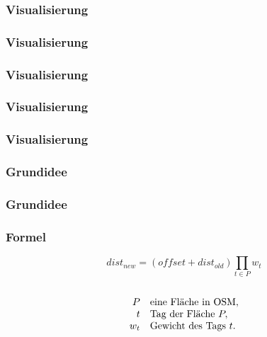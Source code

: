 \begin{frame}
  \frametitle{Visualisierung}
\end{frame}

\begin{frame}[fragile]
  \frametitle{Visualisierung}
  \lstset{language=XML,basicstyle=\tiny}
  
\end{frame}

\begin{frame}
  \frametitle{Visualisierung}
\end{frame}

\begin{frame}
  \frametitle{Visualisierung}
\end{frame}

\begin{frame}
  \frametitle{Visualisierung}
\end{frame}

\begin{frame} %
 \frametitle{Grundidee}
\end{frame}

\begin{frame} %
 \frametitle{Grundidee}
\end{frame}

\begin{frame}
  \frametitle{Formel}
  \begin{Large}
  \begin{equation*}
    dist_{new} = (offset + dist_{old}) \prod_{t\in P} w_{t}
  \end{equation*}
  \qquad \\
\begin{equation*}
\begin{array}{r l}
 P & \text{eine Fl\"ache in OSM},\\
 t & \text{Tag der Fl\"ache }P,\\
 w_t & \text{Gewicht des Tags $t$}.
\end{array}
\end{equation*}
\end{Large}
\end{frame}

